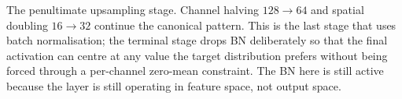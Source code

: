 
The penultimate upsampling stage. Channel halving $128 \to 64$ and
spatial doubling $16 \to 32$ continue the canonical pattern. This is
the last stage that uses batch normalisation; the terminal stage drops
BN deliberately so that the final activation can centre at any value
the target distribution prefers without being forced through a
per-channel zero-mean constraint. The BN here is still active because
the layer is still operating in feature space, not output space.
